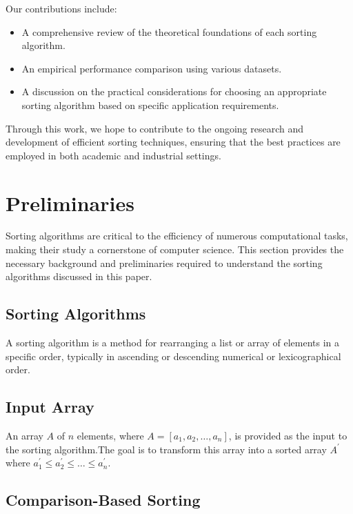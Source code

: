 \documentclass[sigplan,screen]{acmart}
\begin{document}
  Our contributions include:

  \begin{itemize}
    \item A comprehensive review of the theoretical foundations of each 
    sorting algorithm.
    \item An empirical performance comparison using various datasets.
    \item A discussion on the practical considerations for choosing an 
    appropriate sorting algorithm based on specific application requirements.
  \end{itemize}

  Through this work, we hope to contribute to the ongoing research and 
  development of efficient sorting techniques, ensuring that the best 
  practices are employed in both academic and industrial settings.



\section*{Preliminaries}

  Sorting algorithms are critical to the efficiency of numerous computational 
  tasks, making their study a cornerstone of computer science. This section 
  provides the necessary background and preliminaries required to understand 
  the sorting algorithms discussed in this paper.

  \subsection{Sorting Algorithms}
  
  A sorting algorithm is a method for rearranging a list or array of elements 
  in a specific order, typically in ascending or descending numerical or 
  lexicographical order.

  \subsection{Input Array}
  
  An array $A$ of $n$ elements, where $A = [a_1, a_2, \ldots, a_n ] $,
  is provided as the input to the sorting algorithm.The goal is to transform 
  this array into a sorted array $A^\prime $ where 
  $a_1^\prime \leq  a_2^\prime\leq  \ldots \leq a_n^\prime$.

  \subsection{Comparison-Based Sorting}
  
\end{document}
